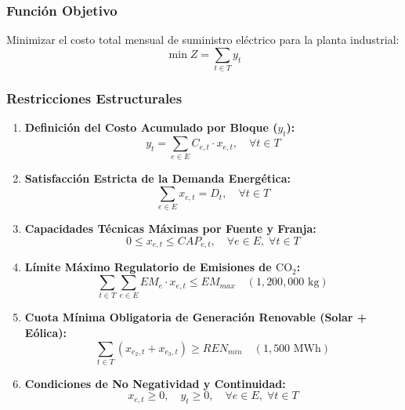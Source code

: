 \documentclass[11pt,a4paper]{article}
\begin{document}
\subsubsection{Función Objetivo}
Minimizar el costo total mensual de suministro eléctrico para la planta industrial:
\begin{equation}
    \min Z = \sum_{t \in T} y_t
\end{equation}

\subsubsection{Restricciones Estructurales}
\begin{enumerate}
    \item \textbf{Definición del Costo Acumulado por Bloque ($y_t$):}
    \begin{equation}
        y_t = \sum_{e \in E} C_{e,t} \cdot x_{e,t}, \quad \forall t \in T
    \end{equation}
    \item \textbf{Satisfacción Estricta de la Demanda Energética:}
    \begin{equation}
        \sum_{e \in E} x_{e,t} = D_t, \quad \forall t \in T
    \end{equation}
    \item \textbf{Capacidades Técnicas Máximas por Fuente y Franja:}
    \begin{equation}
        0 \le x_{e,t} \le CAP_{e,t}, \quad \forall e \in E, \; \forall t \in T
    \end{equation}
    \item \textbf{Límite Máximo Regulatorio de Emisiones de $\text{CO}_2$:}
    \begin{equation}
        \sum_{t \in T} \sum_{e \in E} EM_e \cdot x_{e,t} \le EM_{max} \quad (1,200,000 \text{ kg})
    \end{equation}
    \item \textbf{Cuota Mínima Obligatoria de Generación Renovable (Solar + Eólica):}
    \begin{equation}
        \sum_{t \in T} (x_{e_2,t} + x_{e_3,t}) \ge REN_{min} \quad (1,500 \text{ MWh})
    \end{equation}
    \item \textbf{Condiciones de No Negatividad y Continuidad:}
    \begin{equation}
        x_{e,t} \ge 0, \quad y_t \ge 0, \quad \forall e \in E, \; \forall t \in T
    \end{equation}
\end{enumerate}
\end{document}
